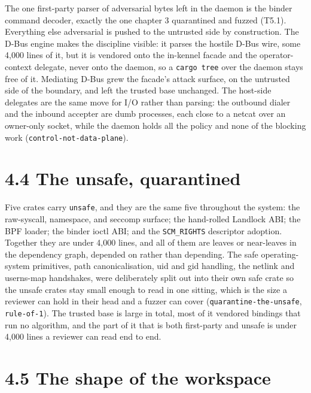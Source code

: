 The one first-party parser of adversarial bytes left in the daemon is
the binder command decoder, exactly the one chapter 3 quarantined and
fuzzed (T5.1). Everything else adversarial is pushed to the untrusted
side by construction. The D-Bus engine makes the discipline visible: it
parses the hostile D-Bus wire, some 4,000 lines of it, but it is
vendored onto the in-kennel facade and the operator-context delegate,
never onto the daemon, so a \texttt{cargo\ tree} over the daemon stays
free of it. Mediating D-Bus grew the facade's attack surface, on the
untrusted side of the boundary, and left the trusted base unchanged. The
host-side delegates are the same move for I/O rather than parsing: the
outbound dialer and the inbound accepter are dumb processes, each close
to a netcat over an owner-only socket, while the daemon holds all the
policy and none of the blocking work (\texttt{control-not-data-plane}).

\hypertarget{the-unsafe-quarantined}{%
\section{4.4 The unsafe, quarantined}\label{the-unsafe-quarantined}}

Five crates carry \texttt{unsafe}, and they are the same five throughout
the system: the raw-syscall, namespace, and seccomp surface; the
hand-rolled Landlock ABI; the BPF loader; the binder ioctl ABI; and the
\texttt{SCM\_RIGHTS} descriptor adoption. Together they are under 4,000
lines, and all of them are leaves or near-leaves in the dependency
graph, depended on rather than depending. The safe operating-system
primitives, path canonicalisation, uid and gid handling, the netlink and
userns-map handshakes, were deliberately split out into their own safe
crate so the unsafe crates stay small enough to read in one sitting,
which is the size a reviewer can hold in their head and a fuzzer can
cover (\texttt{quarantine-the-unsafe}, \texttt{rule-of-1}). The trusted
base is large in total, most of it vendored bindings that run no
algorithm, and the part of it that is both first-party and unsafe is
under 4,000 lines a reviewer can read end to end.

\hypertarget{the-shape-of-the-workspace}{%
\section{4.5 The shape of the
workspace}\label{the-shape-of-the-workspace}}

